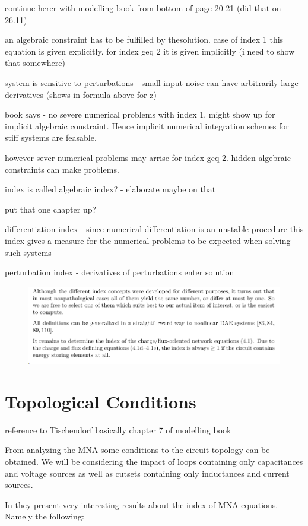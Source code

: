 continue herer with modelling book from bottom of page 20-21 (did that on 26.11)

an algebraic constraint has to be fulfilled by thesolution. case of index 1 this equation is given explicitly. for index geq 2 it is given implicitly (i need to show that somewhere) 

system is sensitive to perturbations - small input noise can have arbitrarily large derivatives (shows in formula above for z)

book says - no severe numerical problems with index 1. might show up for implicit algebraic constraint.  Hence implicit numerical integration schemes for stiff systems are feasable.

however sever numerical problems may arrise for index geq 2. hidden algebraic constraints can make problems.

index is called algebraic index? - elaborate maybe on that

put that one chapter up?

differentiation index - since numerical differentiation is an unstable procedure this index gives a measure for the numerical problems to be expected when solving such systems

perturbation index - derivatives of perturbations enter solution


\begin{figure}[H]
	\centering
	\includegraphics[width=0.7\linewidth]{screenshot022}
	\caption{}
	\label{fig:screenshot022}
\end{figure}


\section{Topological Conditions} 
reference to Tischendorf
basically chapter 7 of modelling book

From analyzing the MNA some conditions to the circuit topology can be obtained. We will be considering the impact of loops containing only capacitances and voltage sources as well as cutsets containing only inductances and current sources.

In \cite{Tischendorf2005Topological} they present very interesting results about the index of MNA equations. Namely the following:


